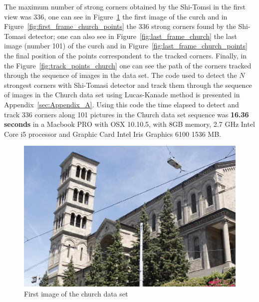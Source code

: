 The maximum number of strong corners obtained by the Shi-Tomsi in the first view was 336, one can see in Figure~\ref{fig:first_frame_church} the first image of the curch and in Figure~\ref{fig:first_frame_church_points} the 336 strong corners found by the Shi-Tomasi detector; one can also see in Figure~\ref{fig:last_frame_church} the last image (number 101) of the curch and in Figure~\ref{fig:last_frame_church_points} the final position of the points correspondent to the tracked corners. Finally, in the Figure~\ref{fig:track_points_church} one can see the path of the corners tracked through the sequence of images in the data set. The code used to detect the $N$ strongest corners with Shi-Tomasi detector and track them through the sequence of images in the Church data set using Lucas-Kanade method is presented in Appendix~\ref{sec:Appendix_A}. Using this code the time elapsed to detect and track 336 corners along 101 pictures in the Church data set sequence was \textbf{16.36 seconds} in a Macbook PRO with OSX 10.10.5, with 8GB memory, 2.7 GHz Intel Core i5 processor and Graphic Card Intel Iris Graphics 6100 1536 MB. 

\begin{figure}[h!]
\centering
\includegraphics[width=1 \textwidth]{./Diagrams/first_frame_church.png}
\caption{First image of the church data set}
\label{fig:first_frame_church}
\end{figure}

